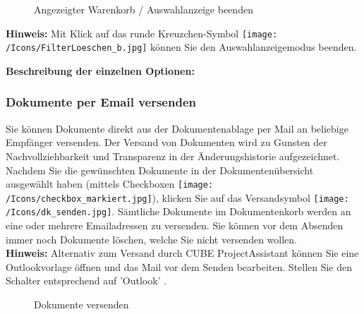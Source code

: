 \begin{figure}[H]
\caption{Angezeigter Warenkorb / Auswahlanzeige beenden}
\end{figure}

\textbf{Hinweis:} Mit Klick auf das runde Kreuzchen-Symbol \texttt{[image: /Icons/FilterLoeschen\_b.jpg]}  können Sie den Auswahlanzeigemodus beenden. 

\vspace{\baselineskip}

\textbf{Beschreibung der einzelnen Optionen:}

\subsubsection{Dokumente per Email versenden}
\label{bkm:Ref201701127}

Sie können Dokumente direkt aus der Dokumentenablage per Mail an beliebige Empfänger versenden. Der Versand von Dokumenten wird zu Gunsten der Nachvollziehbarkeit und Transparenz in der Änderungshistorie aufgezeichnet.\\

Nachdem Sie die gewünschten Dokumente in der Dokumentenübersicht ausgewählt haben (mittels Checkboxen \texttt{[image: /Icons/checkbox\_markiert.jpg]}), klicken Sie auf das Versandsymbol \texttt{[image: /Icons/dk\_senden.jpg]}. Sämtliche Dokumente im Dokumentenkorb werden an eine oder mehrere Emailadressen zu versenden. Sie können vor dem Absenden immer noch Dokumente löschen, welche Sie nicht versenden wollen.\\ 

\textbf{Hinweis:} Alternativ zum Versand durch CUBE ProjectAssistant können Sie eine Outlookvorlage öffnen und das Mail vor dem Senden bearbeiten. Stellen Sie den Schalter entsprechend auf 'Outlook' .

\begin{figure}[H]
\caption{Dokumente versenden}
\end{figure}

